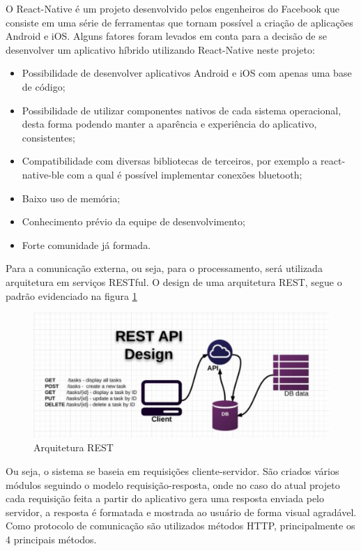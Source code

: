 O React-Native é um projeto desenvolvido pelos engenheiros do Facebook  que consiste em uma série de ferramentas que tornam possível a criação de aplicações Android e iOS. Alguns fatores foram levados em conta para a decisão de se desenvolver um aplicativo híbrido utilizando React-Native neste projeto:

\begin{itemize}
\item Possibilidade de desenvolver aplicativos Android e iOS com apenas uma base de código;
\item Possibilidade de utilizar componentes nativos de cada sistema operacional, desta forma podendo manter a aparência e experiência do aplicativo, consistentes;
\item Compatibilidade com diversas bibliotecas de terceiros,  por exemplo a react-native-ble  com a qual é possível implementar conexões bluetooth;
\item Baixo uso de memória;
\item Conhecimento prévio da equipe de desenvolvimento;
\item Forte comunidade já formada.

\end{itemize}

	Para a comunicação externa, ou seja, para o processamento, será utilizada arquitetura em serviços RESTful.
O design de uma arquitetura REST, segue o padrão evidenciado na figura \ref{img:arquitetura}

\graphicspath{{figuras/}}
\begin{figure}[!htb]
\centering
\includegraphics[scale=0.80]{arquitetura}
\caption{Arquitetura REST}
\label{img:arquitetura}
\end{figure}


Ou seja, o sistema se baseia em requisições cliente-servidor. São criados vários módulos seguindo o modelo requisição-resposta, onde no caso do atual projeto cada requisição feita a partir do aplicativo gera uma resposta enviada pelo servidor, a resposta é formatada e mostrada ao usuário de forma visual agradável. Como protocolo de comunicação são utilizados métodos HTTP, principalmente os 4 principais métodos.

